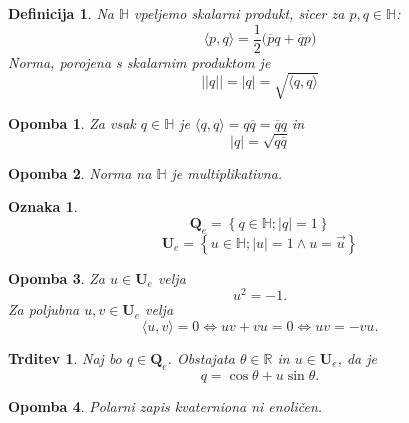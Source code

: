\documentclass{beamer}
\def\R{\mathbb{R}} %
\def\H{\mathbb{H}} %
\def\Qe{\textbf{Q}_{e}} %
\def\Ue{\textbf{U}_{e}} %
\newcommand{\dotpr}[2]{\langle #1, #2 \rangle}
\newcommand{\conj}[1]{\overline{#1}}
\newtheorem{trditev}{Trditev}
\newtheorem{opomba}{Opomba}
\newtheorem{definicija}{Definicija}
\newtheorem{oznaka}{Oznaka}
\begin{document}
\begin{frame}
   \begin{definicija}
      Na $\H$ vpeljemo skalarni produkt, sicer za $p, q \in \H$:
      \[
      \dotpr{p}{q} = \frac{1}{2}\big( \conj{p}q + \conj{q}p \big)
      \]
      Norma, porojena s skalarnim produktom je
      \[
      ||q|| = |q| = \sqrt{\dotpr{q}{q}}   
      \]
   \end{definicija}

   \begin{opomba}
      Za vsak $q \in \H$ je $\dotpr{q}{q} = q\conj{q} = \conj{q}q$ in
      \[
        |q| = \sqrt{q\conj{q}} 
      \]
   \end{opomba}

   \pause
   \begin{opomba}
      Norma na $\H$ je multiplikativna.
   \end{opomba}
\end{frame}


\begin{frame}
   \begin{oznaka}
      \[
         \Qe = \left\{ q \in \H; |q| = 1 \right\}
      \]
      \[
        \Ue = \left\{ u \in \H; |u| = 1 \wedge u = \vec{u} \right\} 
      \]
   \end{oznaka}

   \pause
   \begin{opomba}
      Za $u \in \Ue$ velja
      \[
        u^2 = -1. 
      \]
      Za poljubna $u, v \in \Ue$ velja
      \[
      \dotpr{u}{v} = 0 \iff uv + vu = 0 \iff uv = -vu.
      \]
   \end{opomba}
\end{frame}


\begin{frame}
   \begin{trditev}
      Naj bo $q \in \Qe$. Obstajata $\theta \in \R$ in $u \in \Ue$, da je
      \[
        q  = \cos\theta + u\sin\theta.
      \]
   \end{trditev}

   \begin{opomba}
      Polarni zapis kvaterniona ni enoličen.
   \end{opomba}
\end{frame}

\end{document}
